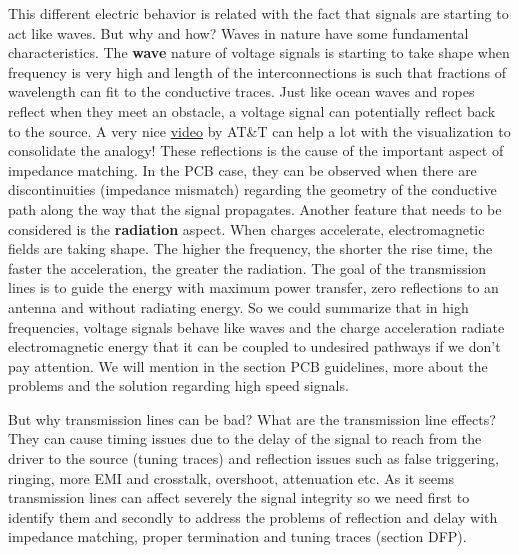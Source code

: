 \documentclass[12pt]{article}
\begin{document}


This different electric behavior is related with the fact that signals are starting to act like waves. But why and how?
Waves in nature have some fundamental characteristics. The \textbf{wave} nature of voltage signals is starting to take shape when frequency is very high and length of the interconnections is such that fractions of wavelength can fit to the conductive traces. Just like ocean waves and ropes reflect when they meet an obstacle, a voltage signal can potentially reflect back to the source. A very nice \href{https://www.youtube.com/watch?v=DovunOxlY1k}{video} by AT\&T can help a lot with the visualization to consolidate the analogy! These reflections is the cause of the important aspect of impedance matching. In the PCB case, they can be observed when there are discontinuities (impedance mismatch) regarding the geometry of the conductive path along the way that the signal propagates. Another feature that needs to be considered is the \textbf{radiation} aspect. When charges accelerate, electromagnetic fields are taking shape. The higher the frequency, the shorter the rise time, the faster the acceleration, the greater the radiation. The goal of the transmission lines is to guide the energy with maximum power transfer, zero reflections to an antenna and without radiating energy. So we could summarize that in high frequencies, voltage signals behave like waves and the charge acceleration radiate electromagnetic energy that it can be coupled to undesired pathways if we don't pay attention. We will mention in the section PCB guidelines, more about the problems and the solution regarding high speed signals.

But why transmission lines can be bad? What are the transmission line effects? They can cause timing issues due to the delay of the signal to reach from the driver to the source (tuning traces) and reflection issues such as false triggering, ringing, more EMI and crosstalk, overshoot, attenuation etc. As it seems transmission lines can affect severely the signal integrity so we need first to identify them and secondly to address the problems of reflection and delay with impedance matching, proper termination and tuning traces (section DFP).
\end{document}
